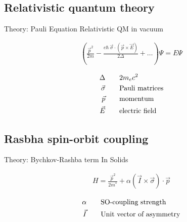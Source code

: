 \documentclass{beamer}
\begin{document}
\subsection{Relativistic quantum theory}
\begin{frame}{Theory: Pauli Equation}
    Relativistic QM in vacuum

    \begin{align*}
        \left( \frac{\vec p^2}{2m}- \frac{e\hbar \ \vec\sigma \cdot (\vec p \times \vec E)}
                        {2\Delta} +\ldots\right)\Psi = E \Psi
    \end{align*}

    \begin{align*}
        \Delta\qquad       & 2m_e c^2\\
        \vec \sigma \qquad & \textnormal{Pauli matrices}\\
        \vec p      \qquad & \textnormal{momentum}\\
        \vec E      \qquad & \textnormal{electric field}\\
    \end{align*}

\end{frame}

\subsection{Rasbha spin-orbit coupling}

\begin{frame}{Theory:  Bychkov-Rashba term}
    In Solids

    \begin{align*}
        H = \frac{\vec p^2}{2 m^*} + \alpha (\vec I \times \vec \sigma) \cdot
        \vec p
    \end{align*}

    \begin{align*}
        \alpha  \qquad & \textnormal{SO-coupling strength}\\
        \vec I  \qquad & \textnormal{Unit vector of asymmetry}
    \end{align*}

\end{frame}
\end{document}
